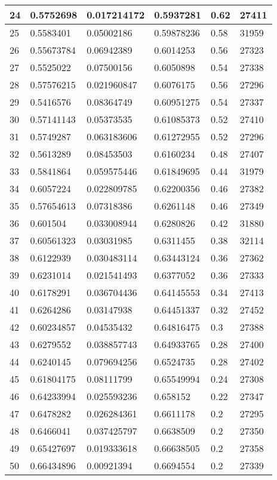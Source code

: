 \begin{longtable}{|l|l|l|l|l|l|}
24 & 0.5752698 & 0.017214172 & 0.5937281 & 0.62 & 27411 \\ \hline 
25 & 0.5583401 & 0.05002186 & 0.59878236 & 0.58 & 31959 \\ \hline 
26 & 0.55673784 & 0.06942389 & 0.6014253 & 0.56 & 27323 \\ \hline 
27 & 0.5525022 & 0.07500156 & 0.6050898 & 0.54 & 27338 \\ \hline 
28 & 0.57576215 & 0.021960847 & 0.6076175 & 0.56 & 27296 \\ \hline 
29 & 0.5416576 & 0.08364749 & 0.60951275 & 0.54 & 27337 \\ \hline 
30 & 0.57141143 & 0.05373535 & 0.61085373 & 0.52 & 27410 \\ \hline 
31 & 0.5749287 & 0.063183606 & 0.61272955 & 0.52 & 27296 \\ \hline 
32 & 0.5613289 & 0.08453503 & 0.6160234 & 0.48 & 27407 \\ \hline 
33 & 0.5841864 & 0.059575446 & 0.61849695 & 0.44 & 31979 \\ \hline 
34 & 0.6057224 & 0.022809785 & 0.62200356 & 0.46 & 27382 \\ \hline 
35 & 0.57654613 & 0.07318386 & 0.6261148 & 0.46 & 27349 \\ \hline 
36 & 0.601504 & 0.033008944 & 0.6280826 & 0.42 & 31880 \\ \hline 
37 & 0.60561323 & 0.03031985 & 0.6311455 & 0.38 & 32114 \\ \hline 
38 & 0.6122939 & 0.030483114 & 0.63443124 & 0.36 & 27362 \\ \hline 
39 & 0.6231014 & 0.021541493 & 0.6377052 & 0.36 & 27333 \\ \hline 
40 & 0.6178291 & 0.036704436 & 0.64145553 & 0.34 & 27413 \\ \hline 
41 & 0.6264286 & 0.03147938 & 0.64451337 & 0.32 & 27452 \\ \hline 
42 & 0.60234857 & 0.04535432 & 0.64816475 & 0.3 & 27388 \\ \hline 
43 & 0.6279552 & 0.038857743 & 0.64933765 & 0.28 & 27400 \\ \hline 
44 & 0.6240145 & 0.079694256 & 0.6524735 & 0.28 & 27402 \\ \hline 
45 & 0.61804175 & 0.08111799 & 0.65549994 & 0.24 & 27308 \\ \hline 
46 & 0.64233994 & 0.025593236 & 0.658152 & 0.22 & 27347 \\ \hline 
47 & 0.6478282 & 0.026284361 & 0.6611178 & 0.2 & 27295 \\ \hline 
48 & 0.6466041 & 0.037425797 & 0.6638509 & 0.2 & 27350 \\ \hline 
49 & 0.65427697 & 0.019333618 & 0.66638505 & 0.2 & 27358 \\ \hline 
50 & 0.66434896 & 0.00921394 & 0.6694554 & 0.2 & 27339 \\ \hline 
\end{longtable}